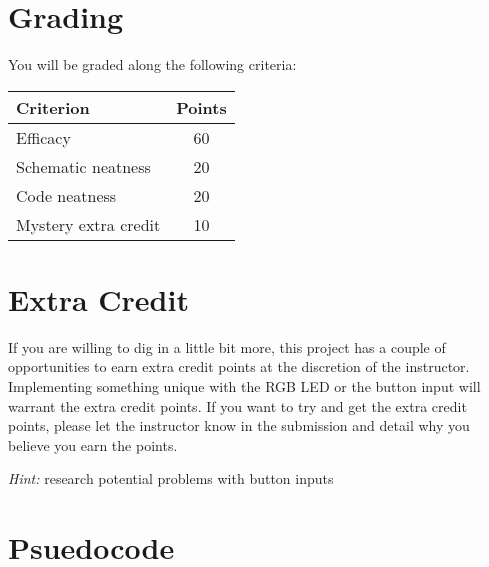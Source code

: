 \section*{Grading}
You will be graded along the following criteria:

\begin{margintable}
    \begin{tabular}{ l | c }
        \toprule
        Criterion & Points \\

        \midrule
        Efficacy & 60 \\
        Schematic neatness & 20 \\
        Code neatness & 20 \\
        Mystery extra credit & 10 \\

        \bottomrule
    \end{tabular}
\end{margintable}


\section*{Extra Credit}
If you are willing to dig in a little bit more, this project has a couple of opportunities to earn extra credit points at the discretion of the instructor.
Implementing something unique with the RGB LED or the button input will warrant the extra credit points.
If you want to try and get the extra credit points, please let the instructor know in the submission and detail why you believe you earn the points.

\textit{Hint:} research potential problems with button inputs

\section*{Psuedocode}

